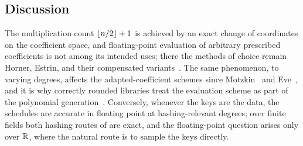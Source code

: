 \subsection{Discussion}

The multiplication count $\left\lfloor {n/2} \right\rfloor+1$ is achieved by an exact change of
coordinates on the coefficient space, and floating-point evaluation of
arbitrary prescribed coefficients is not among its intended uses; there the
methods of choice remain Horner, Estrin, and their compensated
variants~\cite{higham2002accuracy,yu2025compensated}.  The same phenomenon,
to varying degrees, affects the adapted-coefficient schemes since
Motzkin~\cite{motzkin1955evaluation} and Eve~\cite{eve1964evaluation}, and it
is why correctly rounded libraries treat the evaluation scheme as part of the
polynomial generation~\cite{dinechin2007fast,aanjaneya2023fast}.  Conversely,
whenever the keys are the data, the schedules are accurate in floating point
at hashing-relevant degrees; over finite fields both hashing routes of
 are exact, and the floating-point question arises only over
$\mathbb{R}$, where the natural route is to sample the keys directly.

